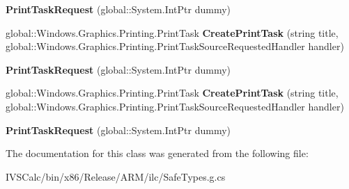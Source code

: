 \begin{DoxyCompactItemize}
{\bfseries Print\+Task\+Request} (global\+::\+System.\+Int\+Ptr dummy)
\item 
\mbox{\label{class_windows_1_1_graphics_1_1_printing_1_1_print_task_request_a81fceb9d986e446a9aadd169a220fa95}} 
global\+::\+Windows.\+Graphics.\+Printing.\+Print\+Task {\bfseries Create\+Print\+Task} (string title, global\+::\+Windows.\+Graphics.\+Printing.\+Print\+Task\+Source\+Requested\+Handler handler)
\item 
\mbox{\label{class_windows_1_1_graphics_1_1_printing_1_1_print_task_request_a57c37fd70c3014c3d9872b3d8a76aa6d}} 
{\bfseries Print\+Task\+Request} (global\+::\+System.\+Int\+Ptr dummy)
\item 
\mbox{\label{class_windows_1_1_graphics_1_1_printing_1_1_print_task_request_a81fceb9d986e446a9aadd169a220fa95}} 
global\+::\+Windows.\+Graphics.\+Printing.\+Print\+Task {\bfseries Create\+Print\+Task} (string title, global\+::\+Windows.\+Graphics.\+Printing.\+Print\+Task\+Source\+Requested\+Handler handler)
\item 
\mbox{\label{class_windows_1_1_graphics_1_1_printing_1_1_print_task_request_a57c37fd70c3014c3d9872b3d8a76aa6d}} 
{\bfseries Print\+Task\+Request} (global\+::\+System.\+Int\+Ptr dummy)
\end{DoxyCompactItemize}


The documentation for this class was generated from the following file\+:\begin{DoxyCompactItemize}
\item 
I\+V\+S\+Calc/bin/x86/\+Release/\+A\+R\+M/ilc/Safe\+Types.\+g.\+cs\end{DoxyCompactItemize}
